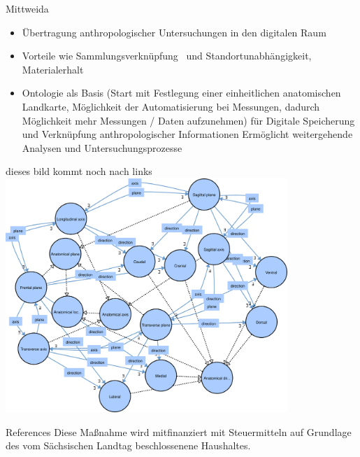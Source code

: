 \documentclass[portrait,final,a0paper,fontscale=0.320]{imiseposter}
\begin{document}
\begin{poster}
\begin{posterbox}[name=results,column=1]{Mittweida}
\begin{itemize}
\item Übertragung anthropologischer Untersuchungen in den digitalen Raum~\cite{digitalisierung}
\item Vorteile wie Sammlungsverknüpfung~\cite{spurensuche} und Standortunabhängigkeit, Materialerhalt 
\item Ontologie als Basis (Start mit Festlegung einer einheitlichen anatomischen Landkarte, Möglichkeit der Automatisierung bei Messungen, dadurch Möglichkeit mehr Messungen / Daten aufzunehmen) für Digitale Speicherung und Verknüpfung anthropologischer Informationen 
Ermöglicht weitergehende Analysen und Untersuchungsprozesse 
\end{itemize}
dieses bild kommt noch nach links\\
\includegraphics[width=0.8\textwidth]{img/location.pdf}
\end{posterbox}
\begin{posterbox}[name=references,column=0,below=ontology]{References}
    \small
Diese Maßnahme wird mitfinanziert mit Steuermitteln auf Grundlage des vom Sächsischen Landtag beschlossenene Haushaltes.
\begingroup
    \renewcommand{\section}[2]{}%

\end{posterbox}
\end{poster}
\end{document}
